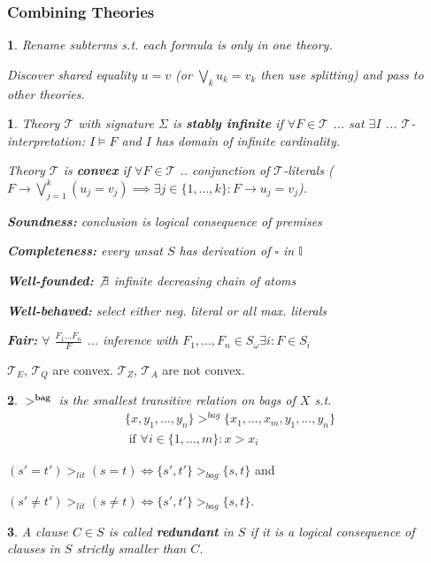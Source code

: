 \documentclass[9pt]{extarticle}
\theoremstyle{theoremstyle}
\newtheorem*{green}{}
\newtheorem*{blue}{}
\begin{document}
\begin{multicols}{3}
\begin{minipage}[t]{.30\textwidth}
\subsubsection*{Combining Theories}
\begin{blue}
Rename subterms s.t. each formula is only in one theory.

Discover shared equality $u=v$ (or $\bigvee_k u_k = v_k$ then use splitting) and pass to other theories.
\end{blue}

\begin{green}
Theory $\mathcal{T}$ with signature $\Sigma$ is \textbf{stably infinite} if $\forall F \in \mathcal{T}$ ... sat $\exists I$ ... $\mathcal{T}$-interpretation: $I \models F$ and $I$ has domain of infinite cardinality.

Theory $\mathcal{T}$ is \textbf{convex} if $\forall F \in \mathcal{T}$ .. conjunction of $\mathcal{T}$-literals ($F \rightarrow \bigvee_{j=1}^k(u_j = v_j) \implies \exists j\in\{1,...,k\}: F \rightarrow u_j = v_j$).

\textbf{Soundness:} conclusion is logical consequence of premises

\textbf{Completeness:} every unsat $S$ has derivation of $\square$ in $\mathbb{I}$

\textbf{Well-founded:} $\not\exists$ infinite decreasing chain of atoms

\textbf{Well-behaved:} select either neg. literal or all max. literals

\textbf{Fair:} $\forall$ $\frac{F_1...F_n}{F}$ ... inference with $F_1,...,F_n \in S_\omega \exists i: F \in S_i$
\end{green}

$\mathcal{T}_E$, $\mathcal{T}_Q$ are convex. $\mathcal{T}_Z$, $\mathcal{T}_A$ are not convex.

\begin{green}
$\mathbf{>^{bag}}$ is the smallest transitive relation on bags of $X$ s.t.
\begin{align*}
	\{x,y_1,...,y_n\} >^{bag} \{x_1,...,x_m,y_1,...,y_n\}\\
	\text{ if } \forall i\in\{1,...,m\}: x>x_i
\end{align*}
\end{green}

$(s' = t') >_{lit} (s=t) \iff \{s',t'\}>_{bag}\{s,t\}$ and

$(s' \not= t') >_{lit} (s\not=t) \iff \{s',t'\}>_{bag}\{s,t\}$.

\begin{green}
A clause $C \in S$ is called \textbf{redundant} in $S$ if it is a logical consequence of clauses in $S$ strictly smaller than $C$.
\end{green}



\end{minipage}
\end{multicols}
\end{document}
